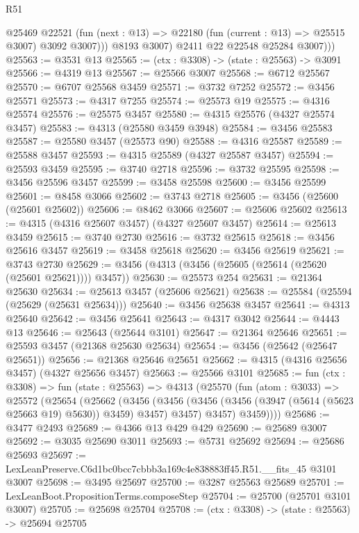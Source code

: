 \begin{lexlean}{R51}
\begin{coremodule}
                @25469
                @22521
                (fun (next : @13) => @22180 (fun (current : @13) => @25515 @3007) @3092 @3007)))
            @8193
            @3007)
          @2411
          @22
          @22548
          @25284
          @3007)))
@25563 := @3531 @13
@25565 := (ctx : @3308) -> (state : @25563) -> @3091
@25566 := @4319 @13
@25567 := @25566 @3007
@25568 := @6712 @25567
@25570 := @6707 @25568 @3459
@25571 := @3732 @7252
@25572 := @3456 @25571
@25573 := @4317 @7255
@25574 := @25573 @19
@25575 := @4316 @25574
@25576 := @25575 @3457
@25580 := @4315 @25576 (@4327 @25574 @3457)
@25583 := @4313 (@25580 @3459 @3948)
@25584 := @3456 @25583
@25587 := @25580 @3457 (@25573 @90)
@25588 := @4316 @25587
@25589 := @25588 @3457
@25593 := @4315 @25589 (@4327 @25587 @3457)
@25594 := @25593 @3459
@25595 := @3740 @2718
@25596 := @3732 @25595
@25598 := @3456 @25596 @3457
@25599 := @3458 @25598
@25600 := @3456 @25599
@25601 := @8458 @3066
@25602 := @3743 @2718
@25605 := @3456 (@25600 (@25601 @25602))
@25606 := @8462 @3066
@25607 := @25606 @25602
@25613 := @4315 (@4316 @25607 @3457) (@4327 @25607 @3457)
@25614 := @25613 @3459
@25615 := @3740 @2730
@25616 := @3732 @25615
@25618 := @3456 @25616 @3457
@25619 := @3458 @25618
@25620 := @3456 @25619
@25621 := @3743 @2730
@25629 := @3456 (@4313 (@3456 (@25605 (@25614 (@25620 (@25601 @25621)))) @3457))
@25630 := @25573 @254
@25631 := @21364 @25630
@25634 := @25613 @3457 (@25606 @25621)
@25638 := @25584 (@25594 (@25629 (@25631 @25634)))
@25640 := @3456 @25638 @3457
@25641 := @4313 @25640
@25642 := @3456 @25641
@25643 := @4317 @3042
@25644 := @4443 @13
@25646 := @25643 (@25644 @3101)
@25647 := @21364 @25646
@25651 := @25593 @3457 (@21368 @25630 @25634)
@25654 := @3456 (@25642 (@25647 @25651))
@25656 := @21368 @25646 @25651
@25662 := @4315 (@4316 @25656 @3457) (@4327 @25656 @3457)
@25663 := @25566 @3101
@25685 := fun (ctx : @3308) =>
  fun (state : @25563) =>
  @4313
    (@25570
      (fun (atom : @3033) =>
      @25572
        (@25654
          (@25662
            (@3456
              (@3456 (@3456 (@3456 (@3947 (@5614 (@5623 @25663 @19) @5630)) @3459) @3457) @3457)
              @3457)
            @3459))))
@25686 := @3477 @2493
@25689 := @4366 @13 @429 @429
@25690 := @25689 @3007
@25692 := @3035 @25690 @3011
@25693 := @5731 @25692
@25694 := @25686 @25693
@25697 := LexLeanPreserve.C6d1bc0bcc7cbbb3a169c4e838883ff45.R51.__fits_45 @3101 @3007
@25698 := @3495 @25697
@25700 := @3287 @25563 @25689
@25701 := LexLeanBoot.PropositionTerms.composeStep
@25704 := @25700 (@25701 @3101 @3007)
@25705 := @25698 @25704
@25708 := (ctx : @3308) -> (state : @25563) -> @25694 @25705

\end{coremodule}
\end{lexlean}
